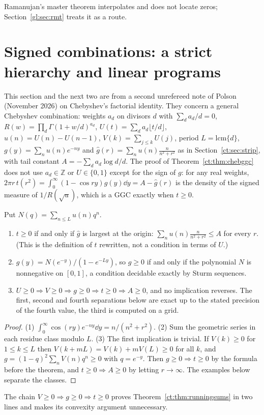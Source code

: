 Ramanujan's master theorem interpolates and does not locate zeros; Section~\ref{gl:sec:rmt} treats it as a route.

\section{Signed combinations: a strict hierarchy and linear programs}\label{ct:sec:hier}

This section and the next two are from a second unrefereed note of Polson (November 2026) on Chebyshev's factorial identity. They concern a general Chebyshev combination: weights $a_d$ on divisors $d$ with $\sum_da_d/d=0$, $R(w)=\prod_d\Gamma(1+w/d)^{a_d}$, $U(t)=\sum_da_d\lfloor t/d\rfloor$, $u(n)=U(n)-U(n-1)$, $V(k)=\sum_{j\le k}U(j)$, period $L=\mathrm{lcm}\{d\}$, $g(y)=\sum_nu(n)e^{-ny}$ and $\hat g(r)=\sum_nu(n)\frac{n}{n^2+r^2}$ as in Section~\ref{ct:sec:strip}, with tail constant $A=-\sum_da_d\log d/d$. The proof of Theorem~\ref{ct:thm:chebggc} does not use $a_d\in\mathbb Z$ or $U\in\{0,1\}$ except for the sign of $g$: for any real weights, $2\pi r\,t(r^2)=\int_0^\infty(1-\cos ry)g(y)\dd y=A-\hat g(r)$ is the density of the signed measure of $1/R(\sqrt u)$, which is a GGC exactly when $t\ge0$.

\begin{theorem}\label{ct:thm:hier}
Put $N(q)=\sum_{n\le L}u(n)q^n$.
\begin{enumerate}
\item $t\ge0$ if and only if $\hat g$ is largest at the origin: $\sum_nu(n)\frac n{n^2+r^2}\le A$ for every $r$. (This is the definition of $t$ rewritten, not a condition in terms of $U$.)
\item $g(y)=N(e^{-y})/(1-e^{-Ly})$, so $g\ge0$ if and only if the polynomial $N$ is nonnegative on $[0,1]$, a condition decidable exactly by Sturm sequences.
\item $U\ge0\Rightarrow V\ge0\Rightarrow g\ge0\Rightarrow t\ge0\Rightarrow A\ge0$, and no implication reverses. The first, second and fourth separations below are exact up to the stated precision of the fourth value, the third is computed on a grid.
\end{enumerate}
\end{theorem}
\begin{proof}
(1) $\int_0^\infty\cos(ry)e^{-ny}\dd y=n/(n^2+r^2)$. (2) Sum the geometric series in each residue class modulo $L$. (3) The first implication is trivial. If $V(k)\ge0$ for $1\le k\le L$ then $V(k+mL)=V(k)+mV(L)\ge0$ for all $k$, and $g=(1-q)^2\sum_nV(n)q^n\ge0$ with $q=e^{-y}$. Then $g\ge0\Rightarrow t\ge0$ by the formula before the theorem, and $t\ge0\Rightarrow A\ge0$ by letting $r\to\infty$. The examples below separate the classes.
\end{proof}
The chain $V\ge0\Rightarrow g\ge0\Rightarrow t\ge0$ proves Theorem~\ref{ct:thm:runningsums} in two lines and makes its convexity argument unnecessary.

